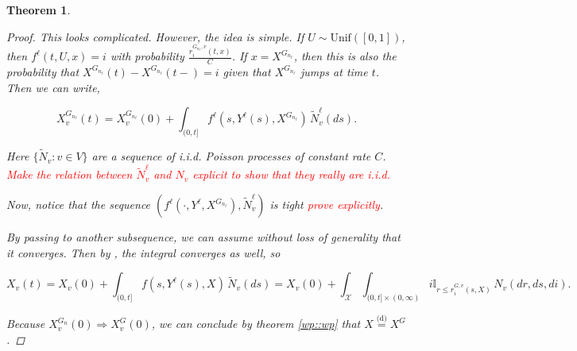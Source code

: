 \documentclass[12pt]{article}
\newcommand{\mb}{\mathbb}
\newcommand{\mc}{\mathcal}
\newcommand{\te}{\text}
\newcommand{\tr}{\textcolor{red}}
\newcommand{\deq}{\overset{\text{(d)}}{=}}			%
\newcommand{\sta}{\mc{X}}							%
\newcommand{\Xf}{X}									%
\newcommand{\poiss}{N}								%
\newcommand{\rate}{r}								%
\newcommand{\xf}{x}									%
\newcommand{\poissv}[1]{_{#1}}						%
\newcommand{\vind}[1]{_{#1}}						%
\newcommand{\tme}[1]{(#1)}							%
\newcommand{\gind}[1]{^{#1}}						%
\newcommand{\stpara}[1]{_{#1}}						%
\newcommand{\gvpara}[2]{^{#1,#2}}					%
\newcommand{\tmepro}[2]{(#1,#2)}					%
\newcommand{\Xg}{Y}									%
\newcommand{\alt}[1]{\tilde{#1}}					%
\renewcommand{\it}[1]{_{#1}}						%
\newtheorem{thms}{Theorem}[section]
\begin{document}
\begin{thms}
\begin{proof}
This looks complicated. However, the idea is simple. If \(U \sim \te{Unif}([0,1])\), then \(f^\ell(t,U,\xf) = i\) with probability \(\frac{\rate\gvpara{G\it{n_\ell}}{v}\stpara{i}\tmepro{t}{\xf}}{C}\). If \(\xf = \Xf\gind{G\it{n_\ell}}\), then this is also the probability that \(\Xf\gind{G\it{n_\ell}}\tme{t} - \Xf\gind{G\it{n_\ell}}\tme{t-} = i\) given that \(\Xf\gind{G\it{n_\ell}}\) jumps at time \(t\). Then we can write,

\[\Xf\gind{G\it{n_\ell}}\vind{v}\tme{t} = \Xf\gind{G\it{n_\ell}}\vind{v}\tme{0} + \int_{(0,t]} f^\ell(s,\Xg^\ell\tme{s},\Xf\gind{G\it{n_\ell}})\,\alt{\poiss}\poissv{v}^\ell(ds).\]

Here \(\{\alt{\poiss}\poissv{v}:v \in V\}\) are a sequence of i.i.d. Poisson processes of constant rate \(C\). \tr{Make the relation between \(\alt{\poiss}\poissv{v}^\ell\) and \(\poiss\poissv{v}\) explicit to show that they really are i.i.d.}

Now, notice that the sequence \((f^\ell(\cdot,\Xg^\ell,\Xf\gind{G\it{n_\ell}}), \alt{\poiss}\poissv{v}^\ell)\) is tight \tr{prove explicitly}.

By passing to another subsequence, we can assume without loss of generality that it converges. Then by \cite[Theorem 2.2, Remark 2.5]{KurPro91}, the integral converges as well, so 

\[\Xf\vind{v}\tme{t} = \Xf\vind{v}\tme{0} + \int_{(0,t]} f(s,\Xg^\ell(s),\Xf)\,\alt{\poiss}\poissv{v}(ds) = \Xf\vind{v}\tme{0} + \int_\sta\int_{(0,t]\times(0,\infty)} i\mb{I}_{r \leq \rate\gvpara{G}{v}\stpara{i}\tmepro{s}{\Xf}}\,\poiss\poissv{v}(dr,ds,di).\]

Because \(\Xf\gind{G\it{n}}\vind{v}\tme{0} \Rightarrow \Xf\gind{G}\vind{v}\tme{0}\), we can conclude by theorem \ref{wp::wp} that \(\Xf \deq \Xf\gind{G}\).
\end{proof}
\end{thms}
\newpage


\end{document}
